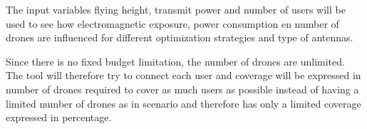 The input variables flying height, transmit power and number of users will be used to see how electromagnetic exposure, power consumption en number of drones are influenced for
different optimization strategies and type of antennas.

Since there is no fixed budget limitation, the number of drones are unlimited. The tool will therefore try to connect each user and
coverage will be expressed in number of drones required to cover as much users as possible instead of having a limited number of drones  
as in scenario and therefore has only a limited coverage expressed in percentage.

